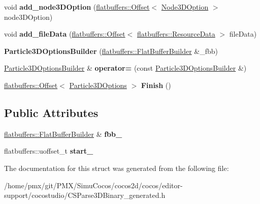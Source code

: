 \begin{DoxyCompactItemize}
void {\bfseries add\+\_\+node3\+D\+Option} (\hyperlink{structflatbuffers_1_1Offset}{flatbuffers\+::\+Offset}$<$ \hyperlink{structflatbuffers_1_1Node3DOption}{Node3\+D\+Option} $>$ node3\+D\+Option)
\item 
\mbox{\label{structflatbuffers_1_1Particle3DOptionsBuilder_a2d0c015cf5b8955eb910e37816a026ad}} 
void {\bfseries add\+\_\+file\+Data} (\hyperlink{structflatbuffers_1_1Offset}{flatbuffers\+::\+Offset}$<$ \hyperlink{structflatbuffers_1_1ResourceData}{flatbuffers\+::\+Resource\+Data} $>$ file\+Data)
\item 
\mbox{\label{structflatbuffers_1_1Particle3DOptionsBuilder_a48788ed00c3d1b90f186557e0541bab7}} 
{\bfseries Particle3\+D\+Options\+Builder} (\hyperlink{classflatbuffers_1_1FlatBufferBuilder}{flatbuffers\+::\+Flat\+Buffer\+Builder} \&\+\_\+fbb)
\item 
\mbox{\label{structflatbuffers_1_1Particle3DOptionsBuilder_a288812f6e9de41bf4872dabdafcf65f5}} 
\hyperlink{structflatbuffers_1_1Particle3DOptionsBuilder}{Particle3\+D\+Options\+Builder} \& {\bfseries operator=} (const \hyperlink{structflatbuffers_1_1Particle3DOptionsBuilder}{Particle3\+D\+Options\+Builder} \&)
\item 
\mbox{\label{structflatbuffers_1_1Particle3DOptionsBuilder_abf47c5920ff52ddefd21456658f4dbe1}} 
\hyperlink{structflatbuffers_1_1Offset}{flatbuffers\+::\+Offset}$<$ \hyperlink{structflatbuffers_1_1Particle3DOptions}{Particle3\+D\+Options} $>$ {\bfseries Finish} ()
\end{DoxyCompactItemize}
\subsection*{Public Attributes}
\begin{DoxyCompactItemize}
\item 
\mbox{\label{structflatbuffers_1_1Particle3DOptionsBuilder_aab0ff022fac94e2d96765f5a238b2569}} 
\hyperlink{classflatbuffers_1_1FlatBufferBuilder}{flatbuffers\+::\+Flat\+Buffer\+Builder} \& {\bfseries fbb\+\_\+}
\item 
\mbox{\label{structflatbuffers_1_1Particle3DOptionsBuilder_ab8ef1685f0f15c088cfe58ada3f989a5}} 
flatbuffers\+::uoffset\+\_\+t {\bfseries start\+\_\+}
\end{DoxyCompactItemize}


The documentation for this struct was generated from the following file\+:\begin{DoxyCompactItemize}
\item 
/home/pmx/git/\+P\+M\+X/\+Simu\+Cocos/cocos2d/cocos/editor-\/support/cocostudio/C\+S\+Parse3\+D\+Binary\+\_\+generated.\+h\end{DoxyCompactItemize}
